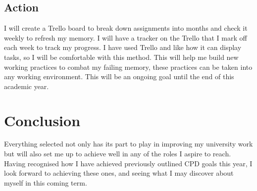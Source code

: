 \documentclass{scrartcl}
\begin{document}
\subsection{Action}
I will create a Trello board to break down assignments into months and check it weekly to refresh my memory. I will have a tracker on the Trello that I mark off each week to track my progress. I have used Trello and like how it can display tasks, so I will be comfortable with this method. This will help me build new working practices to combat my failing memory, these practices can be taken into any working environment. This will be an ongoing goal until the end of this academic year.

\section{Conclusion}
Everything selected not only has its part to play in improving my university work but will also set me up to achieve well in any of the roles I aspire to reach. Having recognised how I have achieved previously outlined CPD goals this year, I look forward to achieving these ones, and seeing what I may discover about myself in this coming term. 
\end{document}
